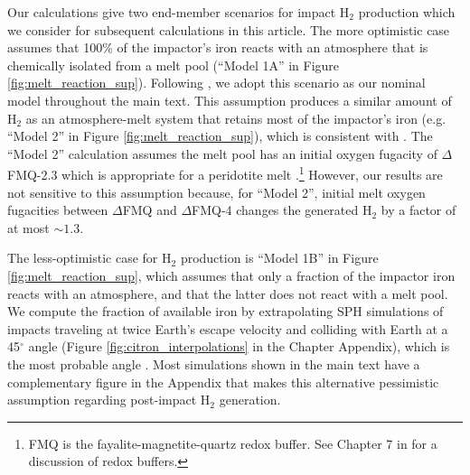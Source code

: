 Our calculations give two end-member scenarios for impact H$_2$ production which we consider for subsequent calculations in this article. The more optimistic case assumes that 100\% of the impactor's iron reacts with an atmosphere that is chemically isolated from a melt pool (``Model 1A'' in Figure \ref{fig:melt_reaction_sup}). Following \citet{Zahnle_2020}, we adopt this scenario as our nominal model throughout the main text. This assumption produces a similar amount of H$_2$ as an atmosphere-melt system that retains most of the impactor's iron (e.g. ``Model 2'' in Figure \ref{fig:melt_reaction_sup}), which is consistent with \citet{Itcovitz_2022}. The ``Model 2'' calculation assumes the melt pool has an initial oxygen fugacity of $\Delta$FMQ-2.3 which is appropriate for a peridotite melt \citep{Itcovitz_2022}.\footnote{FMQ is the fayalite-magnetite-quartz redox buffer. See Chapter 7 in \citet{Catling_2017} for a discussion of redox buffers.} However, our results are not sensitive to this assumption because, for ``Model 2'', initial melt oxygen fugacities between $\Delta$FMQ and $\Delta$FMQ-4 changes the generated H$_2$ by a factor of at most $\sim 1.3$.

The less-optimistic case for H$_2$ production is ``Model 1B'' in Figure \ref{fig:melt_reaction_sup}, which assumes that only a fraction of the impactor iron reacts with an atmosphere, and that the latter does not react with a melt pool. We compute the fraction of available iron by extrapolating SPH simulations of impacts traveling at twice Earth's escape velocity and colliding with Earth at a 45$^{\circ}$ angle (Figure \ref{fig:citron_interpolations} in the Chapter Appendix), which is the most probable angle \citep{Citron_2022}. Most simulations shown in the main text have a complementary figure in the Appendix that makes this alternative pessimistic assumption regarding post-impact H$_2$ generation.


